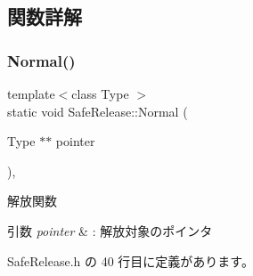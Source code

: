 \subsection{関数詳解}
\mbox{\label{class_safe_release_a6ecab682df939c28d8867a67c2f4b51f}} 
\subsubsection{\texorpdfstring{Normal()}{Normal()}}
{\footnotesize\ttfamily template$<$class Type $>$ \\
static void Safe\+Release\+::\+Normal (\begin{DoxyParamCaption}\item[{Type $\ast$$\ast$}]{pointer }\end{DoxyParamCaption})\hspace{0.3cm}{\ttfamily [inline]}, {\ttfamily [static]}}



解放関数 


\begin{DoxyParams}{引数}
{\em pointer} & \+: 解放対象のポインタ \\
\hline
\end{DoxyParams}


 Safe\+Release.\+h の 40 行目に定義があります。

